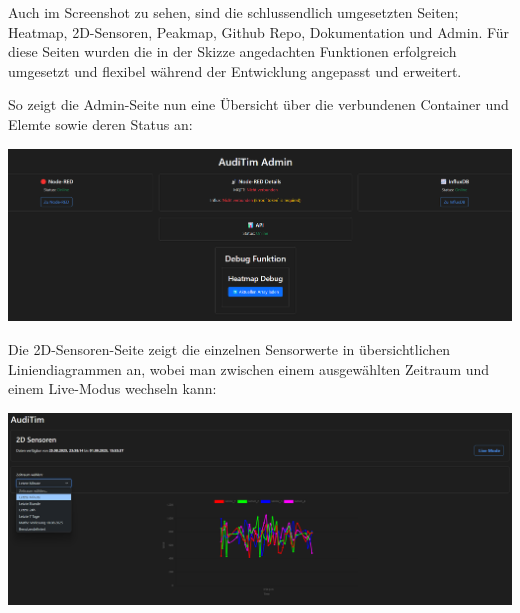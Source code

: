 Auch im Screenshot zu sehen, sind die schlussendlich umgesetzten Seiten; Heatmap, 2D-Sensoren, Peakmap, Github Repo, Dokumentation und Admin. 
Für diese Seiten wurden die in der Skizze angedachten Funktionen erfolgreich umgesetzt und flexibel während der Entwicklung angepasst und erweitert.

So zeigt die Admin-Seite nun eine Übersicht über die verbundenen Container und Elemte sowie deren Status an:
\begin{center}
  \includegraphics[width=1\textwidth]{../images/UI/admin.png}
\end{center}

Die 2D-Sensoren-Seite zeigt die einzelnen Sensorwerte in übersichtlichen Liniendiagrammen an, wobei man zwischen einem ausgewählten Zeitraum und einem Live-Modus wechseln kann:
\begin{center}
  \includegraphics[width=1\textwidth]{../images/UI/zweid.png}
\end{center}

